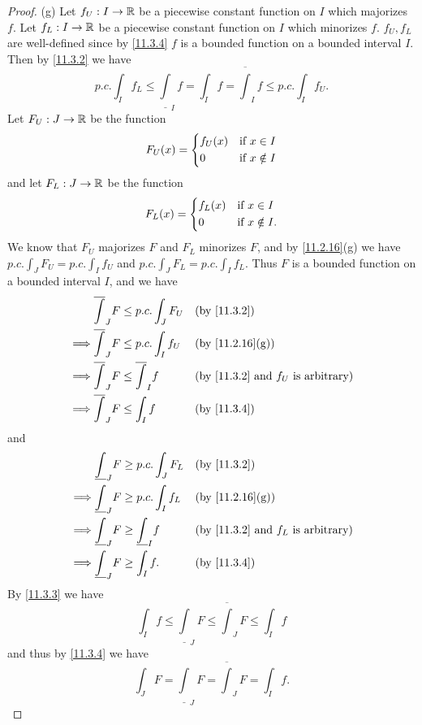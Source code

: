 \begin{proof}{(g)}
  Let \(f_U : I \to \mathbb{R}\) be a piecewise constant function on \(I\) which majorizes \(f\).
  Let \(f_L : I \to \mathbb{R}\) be a piecewise constant function on \(I\) which minorizes \(f\).
  \(f_U, f_L\) are well-defined since by \cref{11.3.4} \(f\) is a bounded function on a bounded interval \(I\).
  Then by \cref{11.3.2} we have
  \[
    p.c. \int_I f_L \leq \underline{\int}_I f = \int_I f = \overline{\int}_I f \leq p.c. \int_I f_U.
  \]
  Let \(F_U : J \to \mathbb{R}\) be the function
  \[
    F_U(x) = \begin{dcases}
      f_U(x) & \text{if } x \in I    \\
      0      & \text{if } x \notin I
    \end{dcases}
  \]
  and let \(F_L : J \to \mathbb{R}\) be the function
  \[
    F_L(x) = \begin{dcases}
      f_L(x) & \text{if } x \in I     \\
      0      & \text{if } x \notin I.
    \end{dcases}
  \]
  We know that \(F_U\) majorizes \(F\) and \(F_L\) minorizes \(F\), and by \cref{11.2.16}(g) we have \(p.c. \int_J F_U = p.c. \int_I f_U\) and \(p.c. \int_J F_L = p.c. \int_I f_L\).
  Thus \(F\) is a bounded function on a bounded interval \(I\), and we have
  \begin{align*}
             & \overline{\int}_J F \leq p.c. \int_J F_U     &  & \text{(by \cref{11.3.2})}                          \\
    \implies & \overline{\int}_J F \leq p.c. \int_I f_U     &  & \text{(by \cref{11.2.16}(g))}                      \\
    \implies & \overline{\int}_J F \leq \overline{\int}_I f &  & \text{(by \cref{11.3.2} and \(f_U\) is arbitrary)} \\
    \implies & \overline{\int}_J F \leq \int_I f            &  & \text{(by \cref{11.3.4})}
  \end{align*}
  and
  \begin{align*}
             & \underline{\int}_J F \geq p.c. \int_J F_L      &  & \text{(by \cref{11.3.2})}                          \\
    \implies & \underline{\int}_J F \geq p.c. \int_I f_L      &  & \text{(by \cref{11.2.16}(g))}                      \\
    \implies & \underline{\int}_J F \geq \underline{\int}_I f &  & \text{(by \cref{11.3.2} and \(f_L\) is arbitrary)} \\
    \implies & \underline{\int}_J F \geq \int_I f.            &  & \text{(by \cref{11.3.4})}
  \end{align*}
  By \cref{11.3.3} we have
  \[
    \int_I f \leq \underline{\int}_J F \leq \overline{\int}_J F \leq \int_I f
  \]
  and thus by \cref{11.3.4} we have
  \[
    \int_J F = \underline{\int}_J F = \overline{\int}_J F = \int_I f.
  \]
\end{proof}

